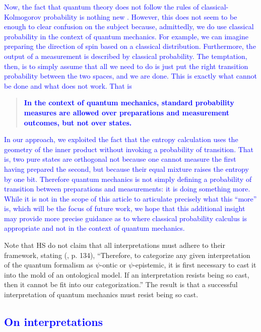 \documentclass[10pt,twocolumn, nofootinbib]{revtex4-2}
\begin{document}
\textcolor{blue}{Now, the fact that quantum theory does not follow the rules of classical-Kolmogorov probability is nothing new \cite{Werner:2014, Pitowsky:1989}. However, this does not seem to be enough to clear confusion on the subject because, admittedly, we do use classical probability in the context of quantum mechanics. For example, we can imagine preparing the direction of spin based on a classical distribution. Furthermore, the output of a measurement is described by classical probability. The temptation, then, is to simply assume that all we need to do is just put the right transition probability between the two spaces, and we are done. This is exactly what cannot be done and what does not work. That is}
\begin{quote}
	\textcolor{blue}{\textbf{In the context of quantum mechanics, standard probability measures are allowed over preparations and measurement outcomes, but not over states.}}
\end{quote}
\textcolor{blue}{In our approach, we exploited the fact that the entropy calculation uses the geometry of the inner product without invoking a probability of transition. That is, two pure states are orthogonal not because one cannot measure the first having prepared the second, but because their equal mixture raises the entropy by one bit. Therefore quantum mechanics is not simply defining a probability of transition between preparations and measurements: it is doing something more. While it is not in the scope of this article to articulate precisely what this ``more'' is, which will be the focus of future work, we hope that this additional insight may provide more precise guidance as to where classical probability calculus is appropriate and not in the context of quantum mechanics.}

Note that HS do not claim that all interpretations must adhere to their framework, stating (\cite{Harrigan:2010}, p. 134), ``Therefore, to categorize any given interpretation of the quantum formalism as $\psi$-ontic or $\psi$-epistemic, it is first necessary to cast it into the mold of an ontological model. If an interpretation resists being so cast, then it cannot be fit into our categorization.'' The result is that a successful interpretation of quantum mechanics must resist being so cast.

\textcolor{blue}{\section{On interpretations}}
\end{document}
